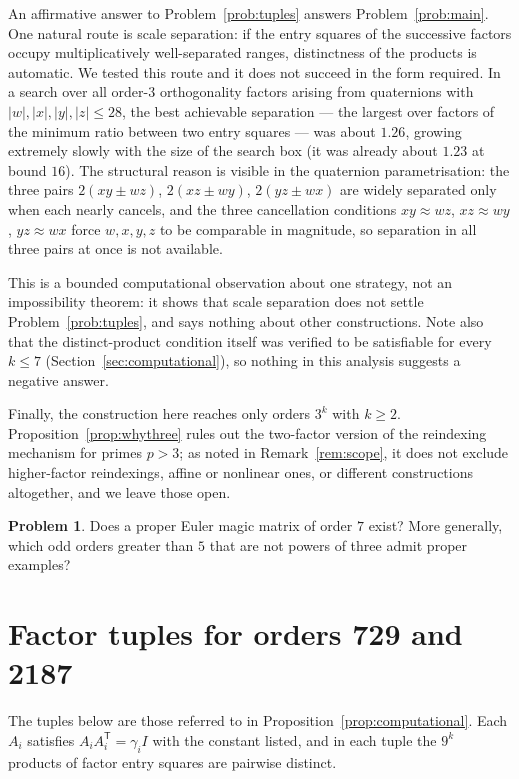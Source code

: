 \documentclass[11pt,a4paper]{amsart}
\theoremstyle{plain}
\theoremstyle{definition}
\newtheorem{problem}[theorem]{Problem}
\theoremstyle{remark}
\newcommand{\tr}{\mathsf{T}}
\begin{document}
An affirmative answer to Problem~\ref{prob:tuples} answers
Problem~\ref{prob:main}. One natural route is scale separation: if the entry
squares of the successive factors occupy multiplicatively well-separated ranges,
distinctness of the products is automatic. We tested this route and it does not
succeed in the form required. In a search over all order-$3$ orthogonality
factors arising from quaternions with $|w|,|x|,|y|,|z|\le28$, the best
achievable separation --- the largest over factors of the minimum ratio between
two entry squares --- was about $1.26$, growing extremely slowly with the size
of the search box (it was already about $1.23$ at bound $16$). The
structural reason is visible in the quaternion parametrisation: the three pairs
$2(xy\pm wz)$, $2(xz\pm wy)$, $2(yz\pm wx)$ are widely separated only when each
nearly cancels, and the three cancellation conditions $xy\approx wz$,
$xz\approx wy$, $yz\approx wx$ force $w,x,y,z$ to be comparable in magnitude, so
separation in all three pairs at once is not available.

This is a bounded computational observation about one strategy, not an
impossibility theorem: it shows that scale separation does not settle
Problem~\ref{prob:tuples}, and says nothing about other constructions. Note also
that the distinct-product condition itself was verified to be satisfiable for
every $k\le7$ (Section~\ref{sec:computational}), so nothing in this analysis
suggests a negative answer.

Finally, the construction here reaches only orders $3^k$ with $k\ge2$.
Proposition~\ref{prop:whythree} rules out the two-factor version of the
reindexing mechanism for primes $p>3$; as noted in Remark~\ref{rem:scope}, it
does not exclude higher-factor reindexings, affine or nonlinear ones, or
different constructions altogether, and we leave those open.

\begin{problem}
Does a proper Euler magic matrix of order $7$ exist? More generally, which odd
orders greater than $5$ that are not powers of three admit proper examples?
\end{problem}

\appendix

\section{Factor tuples for orders 729 and 2187}\label{app:tuples}

The tuples below are those referred to in Proposition~\ref{prop:computational}.
Each $A_i$ satisfies $A_iA_i^{\tr}=\gamma_i I$ with the constant listed, and in
each tuple the $9^k$ products of factor entry squares are pairwise distinct.
\end{document}
